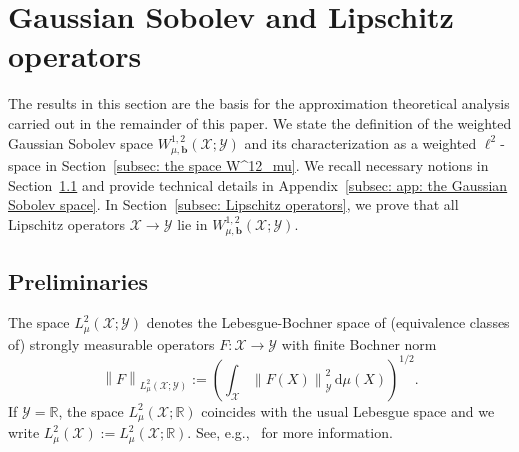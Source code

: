 \documentclass[namedate,webpdf]{ima-authoring-template-blank}
\def\D{\,\mathrm{d}}
\newcommand*{\nm}[1]{{\left\|#1\right \|}}
\numberwithin{counter}{section}
\numberwithin{equation}{section}
\theoremstyle{plain}
\theoremstyle{definition}
\newcommand*{\cX}{\mathcal{X}}
\newcommand*{\cY}{\mathcal{Y}}
\newcommand*{\bbR}{\mathbb{R}}
\theoremstyle{thmstyletwo}
\begin{document}
\section{Gaussian Sobolev and Lipschitz operators}
\label{sec: Gaussian Sobolev and Lipschitz operators}

The results in this section are the basis for the approximation theoretical analysis carried out in the remainder of this paper. 
We state the definition of the weighted Gaussian Sobolev space \(W_{\mu, \bm{b}}^{1 ,2}(\cX; \cY)\) and its characterization as a weighted \(\ell^2\)-space in Section~\ref{subsec: the space W^12_mu}. %
We recall necessary notions in Section~\ref{subsec: preliminaries} and provide technical details in Appendix~\ref{subsec: app: the Gaussian Sobolev space}. In Section~\ref{subsec: Lipschitz operators}, we prove that all Lipschitz operators \(\cX \to \cY\) lie in \(W_{\mu, \bm{b}}^{1 , 2}(\cX; \cY)\).



\subsection{Preliminaries}
\label{subsec: preliminaries}

The space \(L_{\mu}^2(\cX; \cY)\) denotes the Lebesgue-Bochner space of (equivalence classes of) strongly measurable operators \(F: \cX \to \cY\) with finite Bochner norm
\[
\nm{F}_{L_{\mu}^2(\cX; \cY)} := \left( \int_{\cX} \nm{F(X)}_{\cY}^2 \D \mu(X) \right)^{1/2}.
\]
If \(\cY = \bbR\), the space \(L_{\mu}^2(\cX; \bbR)\) coincides with the usual Lebesgue space and we write \(L_{\mu}^2(\cX) := L_{\mu}^2(\cX; \bbR)  \). See, e.g.,~\citet[Ch. 1]{hytonen_AnalysisBanachSpacesVolume_2016} for more information.
\end{document}
